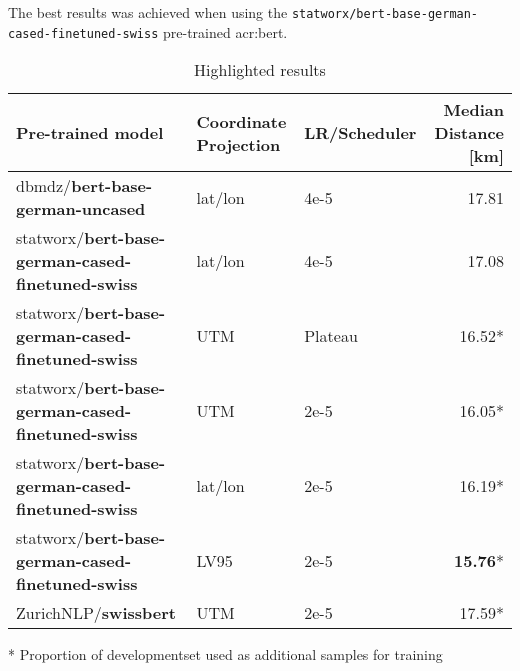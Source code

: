 The best results was achieved when using the \texttt{statworx/bert-base-german-cased-finetuned-swiss} pre-trained \acrshort{acr:bert}.

\begin{table}
    \centering
    \begin{tabular}{p{}|p{}|p{}|r}
        \toprule
        Pre-trained model                                        & Coordinate Projection & LR/Scheduler & Median Distance [km] \\
        \midrule
        dbmdz/\textbf{bert-base-german-uncased}                  & lat/lon               & 4e-5         & 17.81                \\
        statworx/\textbf{bert-base-german-cased-finetuned-swiss} & lat/lon               & 4e-5         & 17.08                \\
        statworx/\textbf{bert-base-german-cased-finetuned-swiss} & UTM                   & Plateau      & 16.52*               \\
        statworx/\textbf{bert-base-german-cased-finetuned-swiss} & UTM                   & 2e-5         & 16.05*               \\
        statworx/\textbf{bert-base-german-cased-finetuned-swiss} & lat/lon               & 2e-5         & 16.19*               \\
        statworx/\textbf{bert-base-german-cased-finetuned-swiss} & LV95                  & 2e-5         & \textbf{15.76}*      \\
        ZurichNLP/\textbf{swissbert}                             & UTM                   & 2e-5         & 17.59*               \\
        \bottomrule
    \end{tabular}
    \caption{Highlighted results}
    \bigskip
    \raggedright
    * Proportion of developmentset used as additional samples for training \\
    \label{tbl:highlighted-results}
\end{table}

